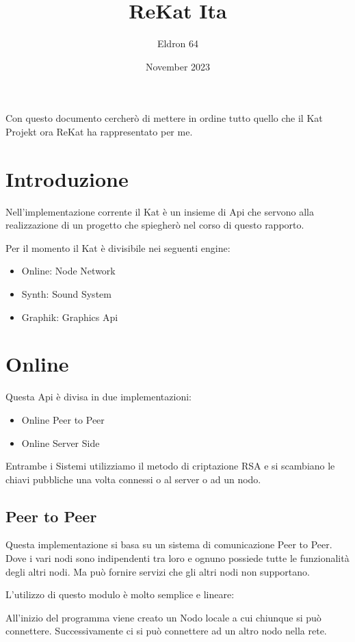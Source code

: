\documentclass{article}
\title{ReKat Ita}
\author{Eldron 64}
\date{November 2023}
\begin{document}
	
\maketitle
Con questo documento cercherò di mettere in ordine tutto quello che il Kat Projekt ora ReKat ha rappresentato per me.

\section{Introduzione}
Nell'implementazione corrente il Kat è un insieme di Api che servono alla realizzazione di un progetto che spiegherò nel corso di questo rapporto.

Per il momento il Kat è divisibile nei seguenti engine:

\begin{itemize}
	\item Online: Node Network
	\item Synth: Sound System
	\item Graphik: Graphics Api
\end{itemize}

\section {Online}
Questa Api è divisa in due implementazioni:

\begin{itemize}
	\item Online Peer to Peer
	\item Online Server Side
\end{itemize}

Entrambe i Sistemi utilizziamo il metodo di criptazione RSA e si scambiano le chiavi pubbliche una volta connessi o al server o ad un nodo.

\subsection{Peer to Peer}
Questa implementazione si basa su un sistema di comunicazione Peer to Peer. Dove i vari nodi sono indipendenti tra loro e ognuno possiede tutte le funzionalità degli altri nodi. Ma può fornire servizi che gli altri nodi non supportano.

L'utilizzo di questo modulo è molto semplice e lineare:

All'inizio del programma viene creato un Nodo locale a cui chiunque si può connettere. Successivamente ci si può connettere ad un altro nodo nella rete.
\end{document}

